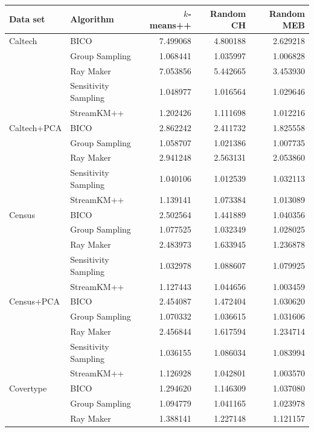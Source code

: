 \begin{longtable}{llrrr}
\toprule
 Data set  & Algorithm     &        $k$-means++&        Random CH&       Random MEB\\
\midrule
Caltech & BICO &   7.499068 &   4.800188 &   2.629218 \\
      & Group Sampling &   1.068441 &   1.035997 &   1.006828 \\
      & Ray Maker &   7.053856 &   5.442665 &   3.453930 \\
      & Sensitivity Sampling &   1.048977 &   1.016564 &   1.029646 \\
      & StreamKM++ &   1.202426 &   1.111698 &   1.012216 \\
\midrule
Caltech+PCA & BICO &   2.862242 &   2.411732 &   1.825558 \\
      & Group Sampling &   1.058707 &   1.021386 &   1.007735 \\
      & Ray Maker &   2.941248 &   2.563131 &   2.053860 \\
      & Sensitivity Sampling &   1.040106 &   1.012539 &   1.032113 \\
      & StreamKM++ &   1.139141 &   1.073384 &   1.013089 \\
\midrule
Census & BICO &   2.502564 &   1.441889 &   1.040356 \\
      & Group Sampling &   1.077525 &   1.032349 &   1.028025 \\
      & Ray Maker &   2.483973 &   1.633945 &   1.236878 \\
      & Sensitivity Sampling &   1.032978 &   1.088607 &   1.079925 \\
      & StreamKM++ &   1.127443 &   1.044656 &   1.003459 \\
\midrule
Census+PCA & BICO &   2.454087 &   1.472404 &   1.030620 \\
      & Group Sampling &   1.070332 &   1.036615 &   1.031606 \\
      & Ray Maker &   2.456844 &   1.617594 &   1.234714 \\
      & Sensitivity Sampling &   1.036155 &   1.086034 &   1.083994 \\
      & StreamKM++ &   1.126928 &   1.042801 &   1.003570 \\
\midrule
Covertype & BICO &   1.294620 &   1.146309 &   1.037080 \\
      & Group Sampling &   1.094779 &   1.041165 &   1.023978 \\
      & Ray Maker &   1.388141 &   1.227148 &   1.121157 \\

\end{longtable}

